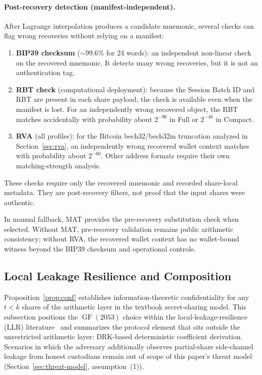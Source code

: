 \documentclass[11pt]{article}
\newcommand{\GF}{\operatorname{GF}}
\begin{document}
\paragraph{Post-recovery detection (manifest-independent).} After Lagrange interpolation produces a candidate mnemonic, several checks can flag wrong recoveries without relying on a manifest:
\begin{enumerate}[noitemsep]
    \item \textbf{BIP39 checksum} (${\sim}99.6\%$ for 24 words): an independent non-linear check on the recovered mnemonic. It detects many wrong recoveries, but it is not an authentication tag.
    \item \textbf{RBT check} (computational deployment): because the Session Batch ID and RBT are present in each share payload, the check is available even when the manifest is lost. For an independently wrong recovered object, the RBT matches accidentally with probability about $2^{-96}$ in Full or $2^{-48}$ in Compact.
    \item \textbf{RVA} (all profiles): for the Bitcoin bech32/bech32m truncation analyzed in Section~\ref{sec:rva}, an independently wrong recovered wallet context matches with probability about $2^{-60}$. Other address formats require their own matching-strength analysis.
\end{enumerate}
These checks require only the recovered mnemonic and recorded share-local metadata. They are post-recovery filters, not proof that the input shares were authentic.

In manual fallback, MAT provides the pre-recovery substitution check when selected. Without MAT, pre-recovery validation remains public arithmetic consistency; without RVA, the recovered wallet context has no wallet-bound witness beyond the BIP39 checksum and operational controls.

\subsection{Local Leakage Resilience and Composition}
\label{sec:llr}

Proposition~\ref{prop:conf} establishes information-theoretic confidentiality for any $t < k$ shares of the arithmetic layer in the textbook secret-sharing model. This subsection positions the $\GF(2053)$ choice within the local-leakage-resilience (LLR) literature~\cite{benhamouda2018,maji2021,klein2023,maji2025} and summarizes the protocol element that sits outside the unrestricted arithmetic layer: DRK-based deterministic coefficient derivation. Scenarios in which the adversary additionally observes partial-share side-channel leakage from honest custodians remain out of scope of this paper's threat model (Section~\ref{sec:threat-model}, assumption~(1)).
\end{document}
